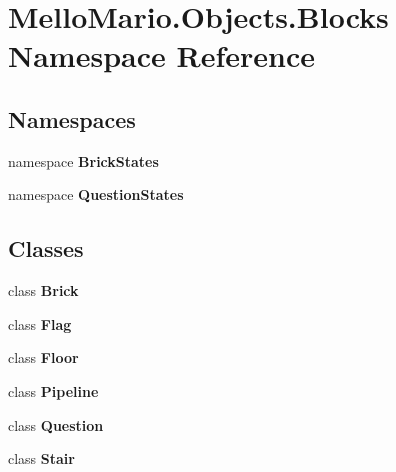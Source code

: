 \section{Mello\+Mario.\+Objects.\+Blocks Namespace Reference}
\label{namespaceMelloMario_1_1Objects_1_1Blocks}
\subsection*{Namespaces}
\begin{DoxyCompactItemize}
\item 
namespace \textbf{ Brick\+States}
\item 
namespace \textbf{ Question\+States}
\end{DoxyCompactItemize}
\subsection*{Classes}
\begin{DoxyCompactItemize}
\item 
class \textbf{ Brick}
\item 
class \textbf{ Flag}
\item 
class \textbf{ Floor}
\item 
class \textbf{ Pipeline}
\item 
class \textbf{ Question}
\item 
class \textbf{ Stair}
\end{DoxyCompactItemize}
